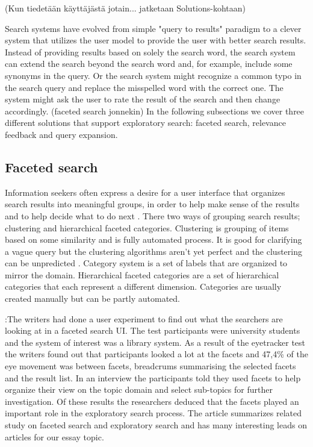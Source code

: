 \documentclass{sigchi}
\begin{document}
(Kun tiedetään käyttäjästä jotain... jatketaan Solutions-kohtaan)

Search systems have evolved from simple "query to results" paradigm to a clever system that utilizes the user model to provide the user with better search results. Instead of providing results based on solely the search word, the search system can extend the search beyond the search word and, for example, include some synonyms in the query. Or the search system might recognize a common typo in the search query and replace the misspelled word with the correct one. The system might ask the user to rate the result of the search and then change accordingly. (faceted search jonnekin) In the following subsections we cover three different solutions that support exploratory search: faceted search, relevance feedback and query expansion.

\subsection{Faceted search}

Information seekers often express a desire for a user interface that organizes search results into meaningful groups, in order to help make sense of the results and to help decide what to do next \cite{hearst06}. There two ways of grouping search results; clustering and hierarchical faceted categories. Clustering is grouping of items based on some similarity and is fully automated process. It is good for clarifying a vague query but the clustering algorithms aren't yet perfect and the clustering can be unpredicted \cite{hearst06}. Category system is a set of labels that are organized to mirror the domain. Hierarchical faceted categories are a set of hierarchical categories that each represent a different dimension. Categories are usually created manually but can be partly automated. 

\cite{kules09}:The writers had done a user experiment to find out what  the searchers are  looking at in a faceted search UI. The test participants were  university students and the system of interest was a library system. As a result  of the eyetracker test the writers found out that participants looked a lot at the facets and  47,4\% of the  eye movement  was between facets, breadcrums summarising the selected facets and the result list. In an interview the participants told they used facets to help organize their view on the topic domain and select sub-topics for further investigation. Of these results the researchers deduced that the facets played an important role in the exploratory search process. 
The article summarizes related study on faceted search and exploratory search and has many interesting leads on articles for our essay topic.
\end{document}
